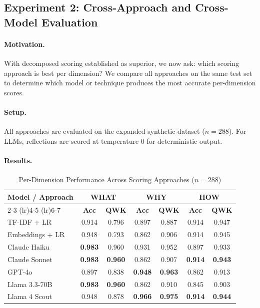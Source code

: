 \documentclass[11pt]{article}
\begin{document}
\subsection{Experiment 2: Cross-Approach and Cross-Model Evaluation}

\paragraph{Motivation.} With decomposed scoring established as superior, we now ask: which scoring approach is best per dimension? We compare all approaches on the same test set to determine which model or technique produces the most accurate per-dimension scores.

\paragraph{Setup.} All approaches are evaluated on the expanded synthetic dataset ($n = 288$). For LLMs, reflections are scored at temperature 0 for deterministic output.

\paragraph{Results.}

\begin{table}[H]
\centering
\caption{Per-Dimension Performance Across Scoring Approaches ($n=288$)}
\label{tab:exp2}
\begin{tabular}{lcccccc}
\toprule
\multirow{2}{*}{\textbf{Model / Approach}} & \multicolumn{2}{c}{\textbf{WHAT}} & \multicolumn{2}{c}{\textbf{WHY}} & \multicolumn{2}{c}{\textbf{HOW}} \\
\cmidrule(lr){2-3} \cmidrule(lr){4-5} \cmidrule(lr){6-7}
 & \textbf{Acc} & \textbf{QWK} & \textbf{Acc} & \textbf{QWK} & \textbf{Acc} & \textbf{QWK} \\
\midrule
TF-IDF + LR        & 0.914 & 0.796 & 0.897 & 0.887 & 0.914 & 0.947 \\
Embeddings + LR    & 0.948 & 0.793 & 0.862 & 0.906 & 0.914 & 0.945 \\
\midrule
Claude Haiku       & \textbf{0.983} & 0.960 & 0.931 & 0.952 & 0.897 & 0.933 \\
Claude Sonnet      & \textbf{0.983} & \textbf{0.960} & 0.862 & 0.907 & \textbf{0.914} & \textbf{0.943} \\
GPT-4o             & 0.897 & 0.838 & \textbf{0.948} & \textbf{0.963} & 0.862 & 0.913 \\
Llama 3.3-70B      & \textbf{0.983} & \textbf{0.960} & 0.862 & 0.910 & 0.845 & 0.903 \\
Llama 4 Scout      & 0.948 & 0.878 & \textbf{0.966} & \textbf{0.975} & \textbf{0.914} & \textbf{0.944} \\
\bottomrule
\end{tabular}
\end{table}
\end{document}
